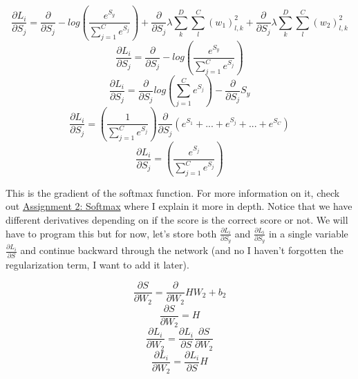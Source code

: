 \documentclass[12pt]{article}
\begin{document}
\begin{equation}
    \frac{\partial L_i}{\partial S_j} =  \frac{\partial}{\partial S_j}
    - log(\frac{e^{S_y}}{{\sum_{j=1}^C} e^{S_j}}) + \frac{\partial}{\partial S_j}
    \lambda \sum_{k}^D \sum_{l}^C (w_1)_{l, k}^2 + \frac{\partial}{\partial S_j}
    \lambda \sum_{k}^D \sum_{l}^C (w_2)_{l, k}^2
\end{equation}
\begin{equation}
    \frac{\partial L_i}{\partial S_j} =  \frac{\partial}{\partial S_j}
    - log(\frac{e^{S_y}}{{\sum_{j=1}^C} e^{S_j}})
\end{equation}
\begin{equation}
    \frac{\partial L_i}{\partial S_j} =  \frac{\partial}{\partial S_j}
    log({\sum_{j=1}^C} e^{S_j}) - \frac{\partial}{\partial S_j} S_y
\end{equation}
\begin{equation}
    \frac{\partial L_i}{\partial S_j} =  (\frac{1}{\sum_{j=1}^C e^{S_j}})
    \frac{\partial}{\partial S_j} (e^{S_1} + ... + e^{S_j} + ... + e^{S_C})
\end{equation}
\begin{equation}
    \frac{\partial L_i}{\partial S_j} =  (\frac{e^{S_j}}{\sum_{j=1}^C e^{S_j}})
\end{equation}

This is the gradient of the softmax function. For more information on it, check out 
\href{https://github.com/bensmidt/EECS-498-DL-Computer-Vision/blob/main/A2/A2-Softmax.pdf}
{Assignment 2: Softmax} where I explain it more in depth. Notice that we have different derivatives 
depending on if the score is the correct score or not. We will have to program this but for now, 
let's store both $\frac{\partial L_i}{\partial S_y}$ and $\frac{\partial L_i}{\partial S_y}$ in a
single variable $\frac{\partial L_i}{\partial S}$ and continue backward through the network (and no 
I haven't forgotten the regularization term, I want to add it later).

\begin{equation}
    \frac{\partial S}{\partial W_2} = \frac{\partial }{\partial W_2} HW_2 + b_2
\end{equation}
\begin{equation}
    \frac{\partial S}{\partial W_2} = H
\end{equation}
\begin{equation}
    \frac{\partial L_i}{\partial W_2} = \frac{\partial L_i}{\partial S} \frac{\partial S}{\partial W_2}
\end{equation}
\begin{equation}
    \frac{\partial L_i}{\partial W_2} = \frac{\partial L_i}{\partial S} H
\end{equation}
\end{document}

